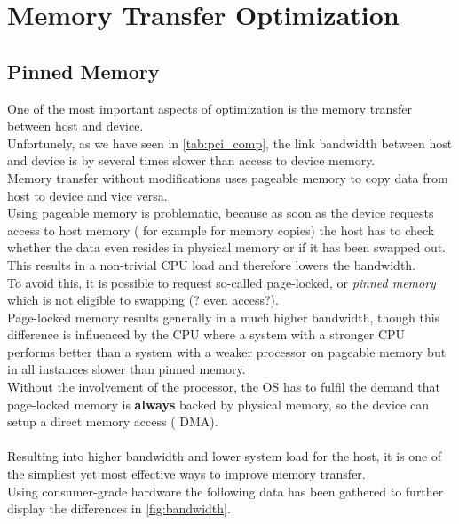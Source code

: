 \section{Memory Transfer Optimization}
\label{sec:transfer}
\subsection{Pinned Memory}
\label{pinned}
One of the most important aspects of optimization is the memory transfer between host and device.\\
Unfortunely, as we have seen in \ref{tab:pci_comp}, the link bandwidth between host and device is by several times slower than access to device memory.\\
Memory transfer without modifications uses pageable memory to copy data from host to device and vice versa.\\
Using pageable memory is problematic, because as soon as the device requests access to host memory ( for example for memory copies)
the host has to check whether the data even resides in physical memory or if it has been swapped out.\\
This results in a non-trivial CPU load and therefore lowers the bandwidth.\\
To avoid this, it is possible to request so-called page-locked, or \emph{pinned memory} which is not eligible to swapping (? even access?).\\
Page-locked memory results generally in a much higher bandwidth, though this difference is influenced by the CPU where a system
with a stronger CPU performs better than a system with a weaker processor on pageable memory but in all instances slower than pinned memory.\\
Without the involvement of the processor, the OS has to fulfil the demand that page-locked memory is \textbf{always} backed by physical memory,
so the device can setup a direct memory access ( DMA).\\\\
Resulting into higher bandwidth and lower system load for the host, it is one of the simpliest yet most effective ways to improve memory transfer.\\
Using consumer-grade hardware the following data has been gathered to further display the differences in \ref{fig:bandwidth}.\\
